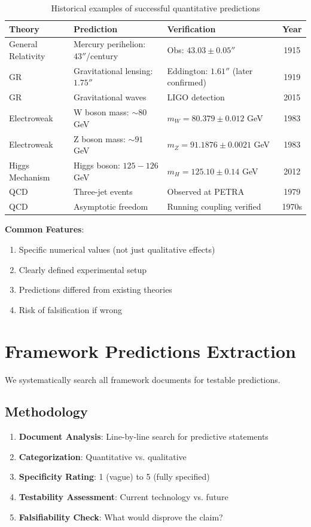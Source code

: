 \begin{table}[H]
\centering
\small
\begin{tabular}{lllc}
\toprule
\textbf{Theory} & \textbf{Prediction} & \textbf{Verification} & \textbf{Year} \\
\midrule
General Relativity & Mercury perihelion: $43''$/century & Obs: $43.03 \pm 0.05''$ & 1915 \\
GR & Gravitational lensing: $1.75''$ & Eddington: $1.61''$ (later confirmed) & 1919 \\
GR & Gravitational waves & LIGO detection & 2015 \\
Electroweak & W boson mass: $\sim 80$ GeV & $m_W = 80.379 \pm 0.012$ GeV & 1983 \\
Electroweak & Z boson mass: $\sim 91$ GeV & $m_Z = 91.1876 \pm 0.0021$ GeV & 1983 \\
Higgs Mechanism & Higgs boson: $125-126$ GeV & $m_H = 125.10 \pm 0.14$ GeV & 2012 \\
QCD & Three-jet events & Observed at PETRA & 1979 \\
QCD & Asymptotic freedom & Running coupling verified & 1970s \\
\bottomrule
\end{tabular}
\caption{Historical examples of successful quantitative predictions}
\end{table}

\textbf{Common Features}:
\begin{enumerate}
    \item Specific numerical values (not just qualitative effects)
    \item Clearly defined experimental setup
    \item Predictions differed from existing theories
    \item Risk of falsification if wrong
\end{enumerate}

\section{Framework Predictions Extraction}

We systematically search all framework documents for testable predictions.

\subsection{Methodology}

\begin{enumerate}
    \item \textbf{Document Analysis}: Line-by-line search for predictive statements
    \item \textbf{Categorization}: Quantitative vs. qualitative
    \item \textbf{Specificity Rating}: 1 (vague) to 5 (fully specified)
    \item \textbf{Testability Assessment}: Current technology vs. future
    \item \textbf{Falsifiability Check}: What would disprove the claim?
\end{enumerate}

